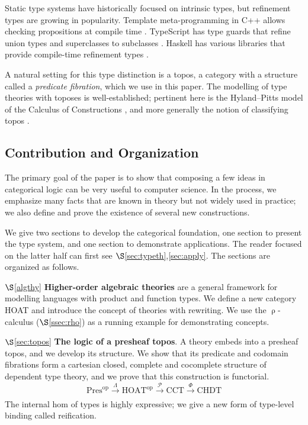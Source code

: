 \documentclass[12pt]{article}
\theoremstyle{definition}
\newcommand{\msc}[1]{\mathscr{#1}}
\newcommand{\mrm}[1]{\mathrm{#1}}
\newcommand{\xr}[2]{\xrightarrow[#2]{#1}}
\newcommand{\op}{\mrm{op}}
\newcommand{\HOAT}{\mrm{HOAT}}
\newcommand{\pow}{\msc{P}}
\begin{document}
Static type systems have historically focused on intrinsic types, but refinement types are growing in popularity. Template meta-programming in C++ allows checking propositions at compile time \cite{template}. TypeScript has type guards that refine union types and superclasses to subclasses \cite{typeguards}. Haskell has various libraries that provide compile-time refinement types \cite{haskellrefinement}.

A natural setting for this type distinction is a topos, a category with a structure called a \textit{predicate fibration}, which we use in this paper. The modelling of type theories with toposes is well-established; pertinent here is the Hyland--Pitts model of the Calculus of Constructions \cite{cocmodel}, and more generally the notion of classifying topos \cite[X]{sheavesinGL}.

\subsection{Contribution and Organization}

The primary goal of the paper is to show that composing a few ideas in categorical logic can be very useful to computer science. In the process, we emphasize many facts that are known in theory but not widely used in practice; we also define and prove the existence of several new constructions.

We give two sections to develop the categorical foundation, one section to present the type system, and one section to demonstrate applications. The reader focused on the latter half can first see $\S$\ref{sec:typeth},\ref{sec:apply}. The sections are organized as follows.

$\S$\ref{algthy} \textbf{Higher-order algebraic theories} \cite{hoat} are a general framework for modelling languages with product and function types. We define a new category HOAT and introduce the concept of theories with rewriting. We use the $\uprho$-calculus ($\S$\ref{ssec:rho}) as a running example for demonstrating concepts.

$\S$\ref{sec:topos} \textbf{The logic of a presheaf topos}. A theory embeds into a presheaf topos, and we develop its structure. We show that its predicate and codomain fibrations form a cartesian closed, complete and cocomplete structure of dependent type theory, and we prove that this construction is functorial.
\[\mrm{Pres}^\op \xr{\Lambda}{} \HOAT^\op\xr{\pow}{} \mrm{CCT} \xr{\Phi}{} \mrm{CHDT}\]
The internal hom of types is highly expressive; we give a new form of type-level binding called reification.
\end{document}
